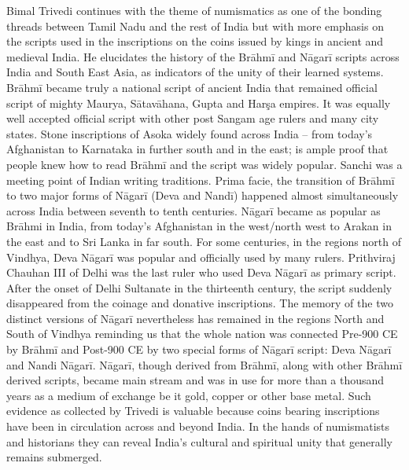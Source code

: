 Bimal Trivedi continues with the theme of numismatics as one of the bonding threads between Tamil Nadu and the rest of India but with more emphasis on the scripts used in the inscriptions on the coins issued by kings in ancient and medieval India. He elucidates the history of the Brāhmī and Nāgarī scripts across India and South East Asia, as indicators of the unity of their learned systems. Brāhmī became truly a national script of ancient India that remained official script of mighty Maurya, Sātavāhana, Gupta and Harşa empires. It was equally well accepted official script with other post Sangam age rulers and many city states. Stone inscriptions of Asoka widely found across India – from today’s Afghanistan to Karnataka in further south and in the east; is ample proof that people knew how to read Brāhmī and the script was widely popular. Sanchi was a meeting point of Indian writing traditions. Prima facie, the transition of Brāhmī to two major forms of Nāgarī (Deva and Nandī) happened almost simultaneously across India between seventh to tenth centuries. Nāgarī became as popular as Brāhmi in India, from today’s Afghanistan in the west/north west to Arakan in the east and to Sri Lanka in far south. For some centuries, in the regions north of Vindhya, Deva Nāgarī was popular and officially used by many rulers. Prithviraj Chauhan III of Delhi was the last ruler who used Deva Nāgarī as primary script. After the onset of Delhi Sultanate in the thirteenth century, the script suddenly disappeared from the coinage and donative inscriptions. The memory of the two distinct versions of Nāgarī nevertheless has remained in the regions North and South of Vindhya reminding us that the whole nation was connected Pre-900 CE by Brāhmī and Post-900 CE by two special forms of Nāgarī script: Deva Nāgarī and Nandi Nāgarī. Nāgarī, though derived from Brāhmī, along with other Brāhmī derived scripts, became main stream and was in use for more than a thousand years as a medium of exchange be it gold, copper or other base metal. Such evidence as collected by Trivedi is valuable because coins bearing inscriptions have been in circulation across and beyond India. In the hands of numismatists and historians they can reveal India’s cultural and spiritual unity that generally remains submerged.

